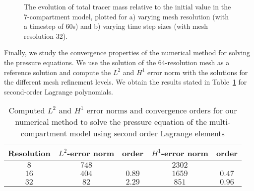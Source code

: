 \documentclass[10pt]{article}
\newcommand{\1}{^{(1)}}
\newcommand{\2}{^{(2)}}
\begin{document}
\begin{figure}
    \centering
    \caption{The evolution of total tracer mass relative to the initial value in the 7-compartment model, plotted for a) varying mesh resolution (with a timestep of 60s) and b) varying time step sizes (with mesh resolution 32).}
    \label{fig: 7comp convergence}
\end{figure}

Finally, we study the convergence properties of the numerical method for solving the pressure equations. We use the solution of the 64-resolution mesh as a reference solution and compute the $L^2$ and $H^1$ error norm with the solutions for the different mesh refinement levels. We obtain the results stated in Table~\ref{tab:error-pressure} for second-order Lagrange polynomials. 
\begin{table}[h]
    \centering
    \begin{tabular}{c|c|c|c|c}
         Resolution & $L^2$-error norm & order & $H^1$-error norm & order \\
         \hline 
         $8$ & $748$ & & $2302$ &  \\
         $16$ & $404$ & $0.89$ & $1659$ & $0.47$\\
         $32$ & $82$ & $2.29$ & $851$ &  $0.96$ \\
    \end{tabular}
    \caption{Computed $L^2$ and $H^1$ error norms and convergence orders for our numerical method to solve the pressure equation of the multi-compartment model using second order Lagrange elements}
    \label{tab:error-pressure}
\end{table}
\FloatBarrier


\end{document}
